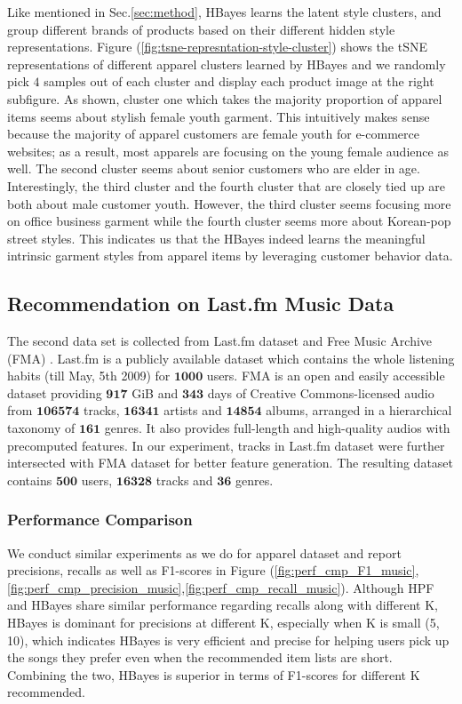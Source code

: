 {Like mentioned in Sec.\ref{sec:method}, HBayes learns the latent style clusters, and group different brands of products based on their different hidden style representations.  Figure (\ref{fig:tsne-represntation-style-cluster}) shows the tSNE \cite{maaten2008visualizing} representations of different apparel clusters learned by HBayes and we randomly pick $4$ samples out of each cluster and display each product image at the right subfigure.  As shown, cluster one which takes the majority proportion of apparel items seems about stylish female youth garment.  This intuitively makes sense because the majority of apparel customers are female youth for e-commerce websites; as a result, most apparels are focusing on the young female audience as well.    The second cluster seems about senior customers who are elder in age.   Interestingly, the third cluster and the fourth cluster that are closely tied up are both about male customer youth.  However, the third cluster seems focusing more on office business garment while the fourth cluster seems more about Korean-pop street styles.  This indicates us that the HBayes indeed learns the meaningful intrinsic garment styles from apparel items by leveraging customer behavior data.   

\subsection{Recommendation on Last.fm Music Data}
The second data set is collected from Last.fm dataset \cite{Celma:Springer2010} and Free Music Archive (FMA) \cite{FMA}. Last.fm is a publicly available dataset which contains the whole listening habits (till May, 5th 2009) for $\mathbf{1000}$ users. FMA is an open and easily accessible dataset providing $\mathbf{917}$ GiB and $\mathbf{343}$ days of Creative Commons-licensed audio from $\mathbf{106574}$ tracks, $\mathbf{16341}$ artists and $\mathbf{14854}$ albums, arranged in a hierarchical taxonomy of $\mathbf{161}$ genres. It also provides full-length and high-quality audios with precomputed features.  In our experiment, tracks in Last.fm dataset were further intersected with FMA dataset for better feature generation.  The resulting dataset contains $\mathbf{500}$ users, $\mathbf{16328}$ tracks and $\mathbf{36}$ genres.

\subsubsection{Performance Comparison}
We conduct similar experiments as we do for apparel dataset and report precisions, recalls as well as F1-scores in Figure (\ref{fig:perf_cmp_F1_music},\ref{fig:perf_cmp_precision_music},\ref{fig:perf_cmp_recall_music}).  Although HPF and HBayes share similar performance regarding recalls along with different K, HBayes is dominant for precisions at different K, especially when K is small (5, 10), which indicates HBayes is very efficient and precise for helping users pick up the songs they prefer even when the recommended item lists are short.   Combining the two, HBayes is superior in terms of F1-scores for different K recommended.  

}
